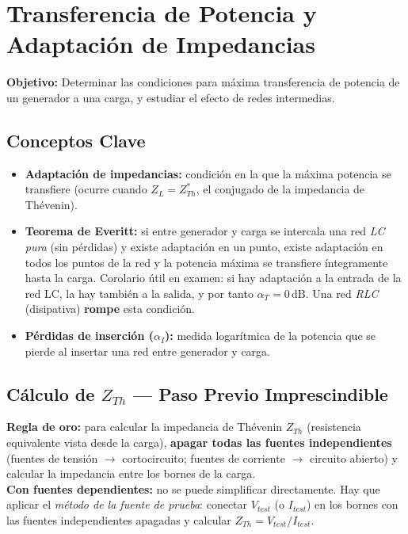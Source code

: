 \documentclass[12pt,a4paper]{article}
\begin{document}
\section{Transferencia de Potencia y Adaptación de Impedancias}

\textbf{Objetivo:} Determinar las condiciones para máxima transferencia de potencia
de un generador a una carga, y estudiar el efecto de redes intermedias.

\subsection{Conceptos Clave}

\begin{itemize}[leftmargin=1.5em, itemsep=4pt]
  \item \textbf{Adaptación de impedancias:} condición en la que la máxima potencia se transfiere (ocurre cuando $Z_L = Z_{Th}^*$, el conjugado de la impedancia de Thévenin).

  \item \textbf{Teorema de Everitt:} si entre generador y carga se intercala una red
        \emph{LC pura} (sin pérdidas) y existe adaptación en un punto, existe adaptación
        en todos los puntos de la red y la potencia máxima se transfiere íntegramente
        hasta la carga. Corolario útil en examen: si hay adaptación a la entrada de
        la red LC, la hay también a la salida, y por tanto $\alpha_T = 0\,\text{dB}$.
        Una red \emph{RLC} (disipativa) \textbf{rompe} esta condición.

  \item \textbf{Pérdidas de inserción ($\alpha_I$):} medida logarítmica de la potencia
        que se pierde al insertar una red entre generador y carga.
\end{itemize}

\subsection{Cálculo de $Z_{Th}$ — Paso Previo Imprescindible}

\begin{warnbox}
\textbf{\color{warnorangeline}Regla de oro:} para calcular la impedancia de Thévenin $Z_{Th}$ (resistencia equivalente vista desde la carga), \textbf{apagar todas las fuentes independientes}
(fuentes de tensión $\to$ cortocircuito; fuentes de corriente $\to$ circuito abierto)
y calcular la impedancia entre los bornes de la carga.\\[4pt]
\textbf{Con fuentes dependientes:} no se puede simplificar directamente. Hay que aplicar
el \emph{método de la fuente de prueba}: conectar $V_{test}$ (o $I_{test}$) en los
bornes con las fuentes independientes apagadas y calcular
$Z_{Th} = V_{test}/I_{test}$.
\end{warnbox}
\clearpage %
\end{document}
